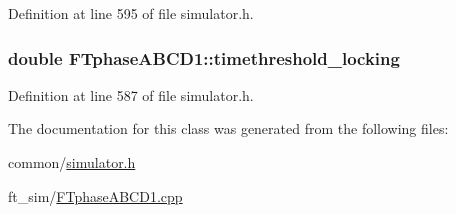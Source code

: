Definition at line 595 of file simulator.h.

\hypertarget{classFTphaseABCD1_ac26f320a11e6168cfd16c247c755907f}{
\subsubsection[{timethreshold\_\-locking}]{\setlength{\rightskip}{0pt plus 5cm}double {\bf FTphaseABCD1::timethreshold\_\-locking}}}
\label{classFTphaseABCD1_ac26f320a11e6168cfd16c247c755907f}


Definition at line 587 of file simulator.h.



The documentation for this class was generated from the following files:\begin{DoxyCompactItemize}
\item 
common/\hyperlink{simulator_8h}{simulator.h}\item 
ft\_\-sim/\hyperlink{FTphaseABCD1_8cpp}{FTphaseABCD1.cpp}\end{DoxyCompactItemize}
